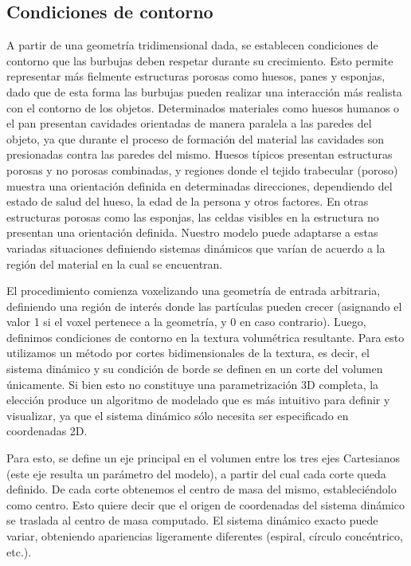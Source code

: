 \subsection{Condiciones de contorno}
A partir de una geometría tridimensional dada, se establecen condiciones de contorno que las burbujas deben respetar durante su crecimiento.
Esto permite representar más fielmente estructuras porosas como huesos, panes y esponjas, dado que de esta forma las burbujas pueden realizar una interacción más realista con el contorno de los objetos.
Determinados materiales como huesos humanos o el pan presentan cavidades orientadas de manera paralela a las paredes del objeto, ya que durante el proceso de formación del material las cavidades son presionadas contra las paredes del mismo.
Huesos típicos presentan estructuras porosas y no porosas combinadas, y regiones donde el tejido trabecular (poroso) muestra una orientación definida en determinadas direcciones, dependiendo del estado de salud del hueso, la edad de la persona y otros factores.
En otras estructuras porosas como las esponjas, las celdas visibles en la estructura no presentan una orientación definida.
Nuestro modelo puede adaptarse a estas variadas situaciones definiendo sistemas dinámicos que varían de acuerdo a la región del material en la cual se encuentran.

El procedimiento comienza voxelizando una geometría de entrada arbitraria, definiendo una región de interés donde las partículas pueden crecer (asignando el valor 1 si el voxel pertenece a la geometría, y 0 en caso contrario).
Luego, definimos condiciones de contorno en la textura volumétrica resultante.
Para esto utilizamos un método por cortes bidimensionales de la textura, es decir, el sistema dinámico y su condición de borde se definen en un corte del volumen únicamente.
Si bien esto no constituye una parametrización 3D completa, la elección produce un algoritmo de modelado que es más intuitivo para definir y visualizar, ya que el sistema dinámico sólo necesita ser especificado en coordenadas 2D.

Para esto, se define un eje principal en el volumen entre los tres ejes Cartesianos (este eje resulta un parámetro del modelo), a partir del cual cada corte queda definido.
De cada corte obtenemos el centro de masa del mismo, estableciéndolo como centro.
Esto quiere decir que el origen de coordenadas del sistema dinámico se traslada al centro de masa computado.
El sistema dinámico exacto puede variar, obteniendo apariencias ligeramente diferentes (espiral, círculo concéntrico, etc.).


